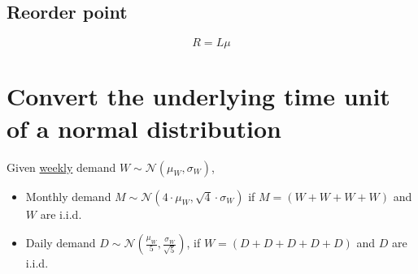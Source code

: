 \documentclass[11pt]{article}
\begin{document}
\subsection{Reorder point}

\begin{equation}
    R = L \mu
\end{equation}

\section{Convert the underlying time unit of a normal distribution}

Given \underline{weekly} demand $W \sim \mathcal{N}(\mu_W, \sigma_W)$,\begin{itemize}
    \item Monthly demand $M \sim \mathcal{N}(4 \cdot \mu_W, \sqrt{4} \cdot \sigma_W)$ if $M = (W + W + W + W)$ and $W$ are i.i.d.
    \item Daily demand $D \sim \mathcal{N}(\frac{\mu_W}{5}, \frac{\sigma_W}{\sqrt{5}})$, if $W = (D + D + D + D + D)$ and $D$ are i.i.d.
\end{itemize}
\end{document}

